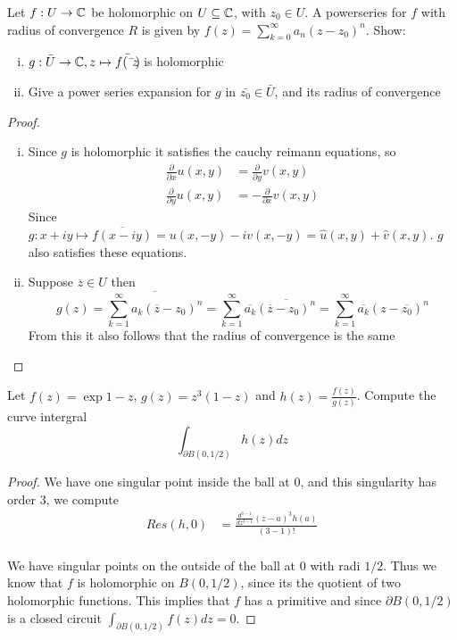 \begin{exercise}
  Let $f: U \to \mathbb{C}$ be holomorphic on $U \subseteq \mathbb{C}$, with $z_{0} \in U$. A powerseries for $f$ with radius of convergence $R$ is given by $f(z) = \sum_{k=0}^{\infty} a_{n}(z-z_{0})^{n}$. Show:
\begin{enumerate}[i)]
    \item $g: \bar{U} \to \mathbb{C}, z \mapsto \bar{f(\bar{z})}$ is holomorphic
    \item Give a power series expansion for $g$ in $\bar{z_{0}} \in \bar{U}$, and its radius of convergence
\end{enumerate}
\end{exercise}
\begin{proof}
\begin{enumerate}[i)]
  \item Since $g$ is holomorphic it satisfies the cauchy reimann equations, so
        \begin{align*}
          \frac{\partial}{\partial x}u(x, y) &= \frac{\partial}{\partial y} v(x, y) \\
          \frac{\partial }{\partial y} u(x, y) &= - \frac{\partial}{\partial x} v(x, y)
        \end{align*}
        Since $g: x + iy \mapsto \overline{f(x - iy)} = u(x, -y) - iv(x, -y) = \hat{u}(x, y) + \hat{v}(x, y)$. $g$ also satisfies these equations.
  \item Suppose $\overline{z} \in U$ then
        \begin{equation}
          g(z) =\overline{\sum_{k=1}^\infty a_{k}(\overline{z} - z_{0})^{n}} = \sum_{k=1}^\infty \overline{a_{k}}\overline{(\overline{z} - z_{0})^{n}} = \sum_{k=1}^\infty \overline{a_{k}}(z - \overline{z_{0}})^{n}
        \end{equation}
        From this it also follows that the radius of convergence is the same
\end{enumerate}
\end{proof}

\begin{exercise}
  Let $f(z) = \exp{1 - z}$, $g(z) = z^{3}(1 - z)$ and $h(z) = \frac{f(z)}{g(z)}$. Compute the curve intergral
  \begin{equation}
    \int_{\partial B(0, 1/2)} h(z) dz
  \end{equation}
\end{exercise}
\begin{proof}
  We have one singular point inside the ball at $0$, and this singularity has order $3$, we compute
  \begin{align*}
    Res(h, 0) &= \frac{\frac{d^{3 - 1}}{d z^{3 - 1}}(z - a)^{3}h(a)}{(3 - 1)!} \\
  \end{align*}



  We have singular points on the outside of the ball at $0$ with radi $1/2$. Thus we know that $f$ is holomorphic on $B(0, 1/2)$, since its the quotient of two holomorphic functions. This implies that $f$ has a primitive and since $\partial B(0, 1/2)$ is a closed circuit $\int_{\partial B(0, 1/2)} f(z) dz = 0$.
\end{proof}

